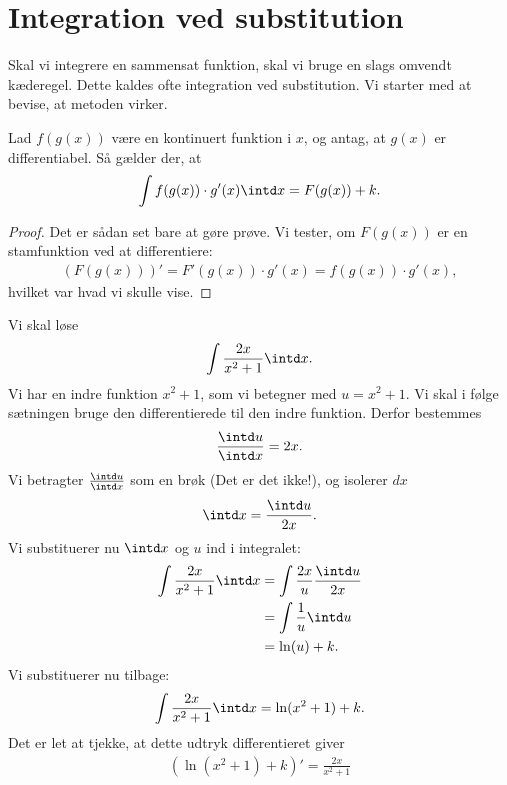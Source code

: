 \section*{Integration ved substitution}

Skal vi integrere en sammensat funktion, skal vi bruge en slags omvendt kæderegel. Dette kaldes ofte integration ved substitution. 
Vi starter med at bevise, at metoden virker.
\begin{setn}
Lad $f(g(x))$ være en kontinuert funktion i $x$, og antag, at $g(x)$ er differentiabel. Så gælder der, at 
\begin{align*}
\int f(g(x))\cdot g'(x) \intd x = F(g(x))+k.
\end{align*}
\end{setn}
\begin{proof}
Det er sådan set bare at gøre prøve. Vi tester, om $F(g(x))$ er en stamfunktion ved at differentiere:
\begin{align*}
\left(F(g(x))\right)' = F'(g(x))\cdot g'(x) = f(g(x))\cdot g'(x),
\end{align*}
hvilket var hvad vi skulle vise. 
\end{proof}

\begin{exa}
Vi skal løse
\begin{align*}
\int \frac{2x}{x^2+1}\intd x.
\end{align*}
Vi har en indre funktion $x^2+1$, som vi betegner med $u = x^2+1$. Vi skal i følge sætningen bruge den differentierede til den indre funktion. Derfor bestemmes 
\begin{align*}
\frac{\intd u}{\intd x} = 2x.
\end{align*}
Vi betragter $\frac{\intd u}{\intd x}$ som en brøk (Det er det ikke!), og isolerer $dx$
\begin{align*}
\intd x = \frac{\intd u}{2x}.
\end{align*}
Vi substituerer nu $\intd x$ og $u$ ind i integralet:
\begin{align*}
\int \frac{2x}{x^2+1} \intd x &= \int \frac{2x}{u} \frac{\intd u}{2x}\\
&= \int \frac{1}{u} \intd u \\
&= \ln(u) + k.
\end{align*}
Vi substituerer nu tilbage:
\begin{align*}
\int \frac{2x}{x^2+1} \intd x  = \ln(x^2+1)+k.
\end{align*}
Det er let at tjekke, at dette udtryk differentieret giver 
\begin{align*}
(\ln(x^2+1)+k)' = \frac{2x}{x^2+1}
\end{align*}
\end{exa}



